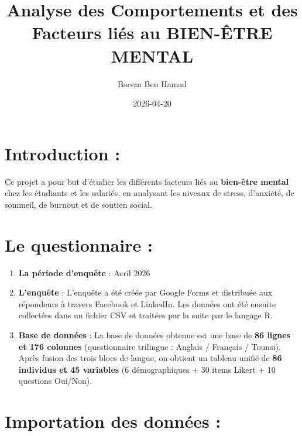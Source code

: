 \documentclass[
]{article}
\title{Analyse des Comportements et des Facteurs liés au BIEN-ÊTRE
MENTAL}
\author{Bacem Ben Hamad}
\date{2026-04-20}
\providecommand{\tightlist}{%
  \setlength{\itemsep}{0pt}\setlength{\parskip}{0pt}}
\begin{document}
\maketitle

\hypertarget{introduction}{%
\section{Introduction :}\label{introduction}}

Ce projet a pour but d'étudier les différents facteurs liés au
\textbf{bien-être mental} chez les étudiants et les salariés, en
analysant les niveaux de stress, d'anxiété, de sommeil, de burnout et de
soutien social.

\hypertarget{le-questionnaire}{%
\section{Le questionnaire :}\label{le-questionnaire}}

\begin{enumerate}
\def\labelenumi{\arabic{enumi}.}
\tightlist
\item
  \textbf{La période d'enquête} : Avril 2026
\item
  \textbf{L'enquête} : L'enquête a été créée par Google Forms et
  distribuée aux répondeurs à travers Facebook et LinkedIn. Les données
  ont été ensuite collectées dans un fichier CSV et traitées par la
  suite par le langage R.
\item
  \textbf{Base de données} : La base de données obtenue est une base de
  \textbf{86 lignes et 176 colonnes} (questionnaire trilingue : Anglais
  / Français / Tounsi). Après fusion des trois blocs de langue, on
  obtient un tableau unifié de \textbf{86 individus et 45 variables} (6
  démographiques + 30 items Likert + 10 questions Oui/Non).
\end{enumerate}

\hypertarget{importation-des-donnuxe9es}{%
\section{Importation des données :}\label{importation-des-donnuxe9es}}
\end{document}

